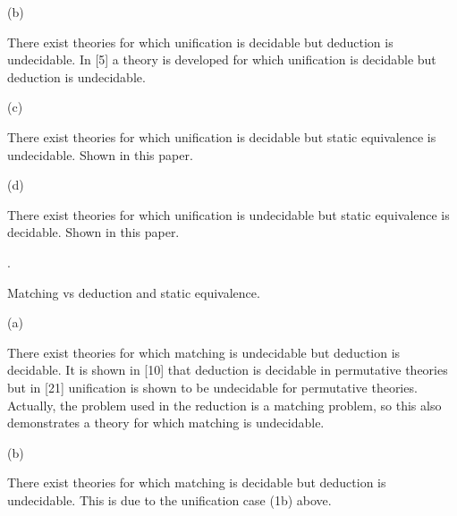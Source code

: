 \documentclass[10pt,a4paper]{amsart}
\begin{document}
 
 
\par\noindent  (b) 
 
There exist theories for which unification is decidable but deduction is undecidable. In [5] a theory is developed for which unification is decidable but deduction is undecidable.\par
 
 
 
\par\noindent  (c) 
 
There exist theories for which unification is decidable but static equivalence is undecidable. Shown in this paper.\par
 
 
 
\par\noindent  (d) 
 
There exist theories for which unification is undecidable but static equivalence is decidable. Shown in this paper.\par
 
 
  
 
 
\par{}. 
 
Matching vs deduction and static equivalence.\par
  
\par\noindent  (a) 
 
There exist theories for which matching is undecidable but deduction is decidable. It is shown in [10] that deduction is decidable in permutative theories but in [21] unification is shown to be undecidable for permutative theories. Actually, the problem used in the reduction is a matching problem, so this also demonstrates a theory for which matching is undecidable.\par
 
 
 
\par\noindent  (b) 
 
There exist theories for which matching is decidable but deduction is undecidable. This is due to the unification case (1b) above.\par
 
\end{document}
